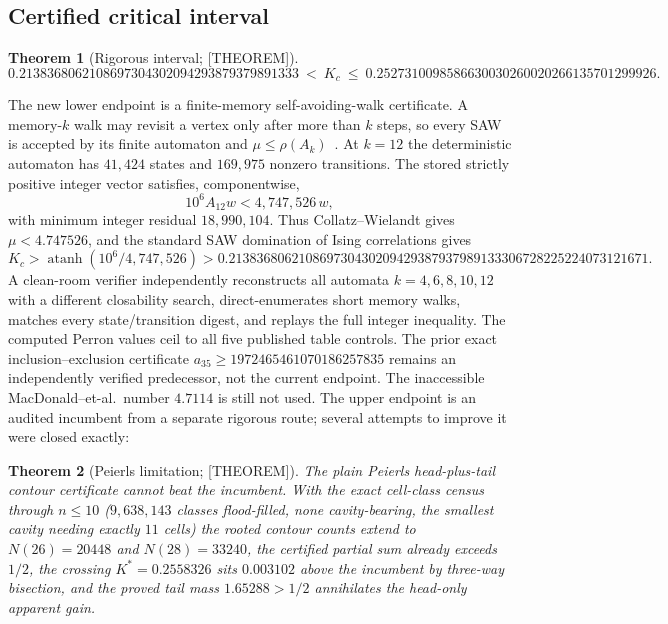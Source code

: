 \documentclass[11pt]{article}
\newtheorem{theorem}{Theorem}[section]
\theoremstyle{definition}
\begin{document}
\subsection{Certified critical interval}\label{sec:bounds}
\begin{theorem}[Rigorous interval; {[THEOREM]}]\label{thm:interval}
\[
0.2138368062108697304302094293879379891333\ <\ K_c\ \le\
0.2527310098586630030260020266135701299926 .
\]
\end{theorem}

The new lower endpoint is a finite-memory self-avoiding-walk certificate. A memory-$k$ walk may
revisit a vertex only after more than $k$ steps, so every SAW is accepted by its finite automaton
and $\mu\le\rho(A_k)$~\cite{poenitz_tittmann2000_saw_upper}. At $k=12$ the deterministic automaton
has $41{,}424$ states and $169{,}975$ nonzero transitions. The stored strictly positive integer
vector satisfies, componentwise,
\[
10^6 A_{12}w<4{,}747{,}526\,w,
\]
with minimum integer residual $18{,}990{,}104$. Thus Collatz--Wielandt gives
$\mu<4.747526$, and the standard SAW domination of Ising correlations gives
\[
K_c>\operatorname{atanh}(10^6/4{,}747{,}526)
>0.213836806210869730430209429387937989133306728225224073121671.
\]
A clean-room verifier independently reconstructs all automata $k=4,6,8,10,12$ with a different
closability search, direct-enumerates short memory walks, matches every state/transition digest, and
replays the full integer inequality. The computed Perron values ceil to all five published table
controls. The prior exact inclusion--exclusion certificate
$a_{35}\ge1972465461070186257835$ remains an independently verified predecessor, not the current
endpoint. The inaccessible MacDonald--et-al.\ number $4.7114$ is still not used.
The upper endpoint is an audited incumbent from a separate rigorous route; several attempts to improve
it were closed exactly:

\begin{theorem}[Peierls limitation; {[THEOREM]}]
The plain Peierls head-plus-tail contour certificate cannot beat the incumbent. With the exact
cell-class census through $n\le10$ ($9{,}638{,}143$ classes flood-filled, none cavity-bearing, the
smallest cavity needing exactly $11$ cells) the rooted contour counts extend to $N(26)=20448$ and
$N(28)=33240$, the certified partial sum already exceeds $1/2$, the crossing $K^*=0.2558326$ sits
$0.003102$ above the incumbent by three-way bisection, and the proved tail mass $1.65288>1/2$
annihilates the head-only apparent gain.
\end{theorem}
\end{document}
